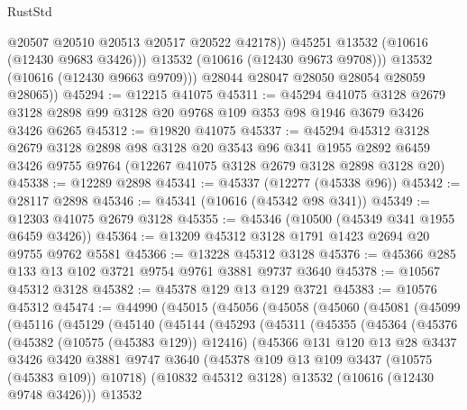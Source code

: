 \begin{lexlean}{RustStd}
\begin{coremodule}
                  @20507
                  @20510
                  @20513
                  @20517
                  @20522
                  @42178))
              @45251
              @13532
              (@10616 (@12430 @9683 @3426)))
            @13532
            (@10616 (@12430 @9673 @9708)))
          @13532
          (@10616 (@12430 @9663 @9709)))
        @28044
        @28047
        @28050
        @28054
        @28059
        @28065))
@45294 := @12215 @41075
@45311 := @45294
    @41075
    @3128
    @2679
    @3128
    @2898
    @99
    @3128
    @20
    @9768
    @109
    @353
    @98
    @1946
    @3679
    @3426
    @3426
    @6265
@45312 := @19820 @41075
@45337 := @45294
    @45312
    @3128
    @2679
    @3128
    @2898
    @98
    @3128
    @20
    @3543
    @96
    @341
    @1955
    @2892
    @6459
    @3426
    @9755
    @9764
    (@12267 @41075 @3128 @2679 @3128 @2898 @3128 @20)
@45338 := @12289 @2898
@45341 := @45337 (@12277 (@45338 @96))
@45342 := @28117 @2898
@45346 := @45341 (@10616 (@45342 @98 @341))
@45349 := @12303 @41075 @2679 @3128
@45355 := @45346 (@10500 (@45349 @341 @1955 @6459 @3426))
@45364 := @13209 @45312 @3128 @1791 @1423 @2694 @20 @9755 @9762 @5581
@45366 := @13228 @45312 @3128
@45376 := @45366 @285 @133 @13 @102 @3721 @9754 @9761 @3881 @9737 @3640
@45378 := @10567 @45312 @3128
@45382 := @45378 @129 @13 @129 @3721
@45383 := @10576 @45312
@45474 := @44990
    (@45015
      (@45056
        (@45058
          (@45060
            (@45081
              (@45099
                (@45116
                  (@45129
                    (@45140
                      (@45144
                        (@45293
                          (@45311
                            (@45355
                              (@45364
                                (@45376
                                  (@45382 (@10575 (@45383 @129)) @12416)
                                  (@45366
                                    @131
                                    @120
                                    @13
                                    @28
                                    @3437
                                    @3426
                                    @3420
                                    @3881
                                    @9747
                                    @3640
                                    (@45378 @109 @13 @109 @3437 (@10575 (@45383 @109)) @10718)
                                    (@10832 @45312 @3128)
                                    @13532
                                    (@10616 (@12430 @9748 @3426)))
                                  @13532

\end{coremodule}
\end{lexlean}
